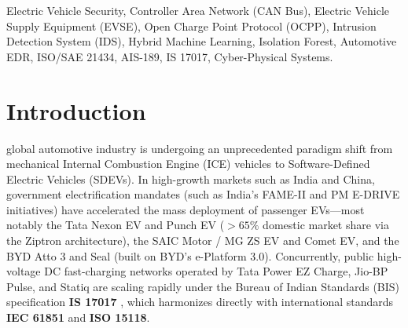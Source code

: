 \documentclass[conference]{IEEEtran}
\begin{document}
\begin{IEEEkeywords}
Electric Vehicle Security, Controller Area Network (CAN Bus), Electric Vehicle Supply Equipment (EVSE), Open Charge Point Protocol (OCPP), Intrusion Detection System (IDS), Hybrid Machine Learning, Isolation Forest, Automotive EDR, ISO/SAE 21434, AIS-189, IS 17017, Cyber-Physical Systems.
\end{IEEEkeywords}

\section{Introduction}
 global automotive industry is undergoing an unprecedented paradigm shift from mechanical Internal Combustion Engine (ICE) vehicles to Software-Defined Electric Vehicles (SDEVs). In high-growth markets such as India and China, government electrification mandates (such as India's FAME-II and PM E-DRIVE initiatives) have accelerated the mass deployment of passenger EVs---most notably the Tata Nexon EV and Punch EV ($>65\%$ domestic market share via the Ziptron architecture), the SAIC Motor / MG ZS EV and Comet EV, and the BYD Atto 3 and Seal (built on BYD's e-Platform 3.0). Concurrently, public high-voltage DC fast-charging networks operated by Tata Power EZ Charge, Jio-BP Pulse, and Statiq are scaling rapidly under the Bureau of Indian Standards (BIS) specification \textbf{IS 17017} \cite{arai2024}, which harmonizes directly with international standards \textbf{IEC 61851} and \textbf{ISO 15118}.
\end{document}
